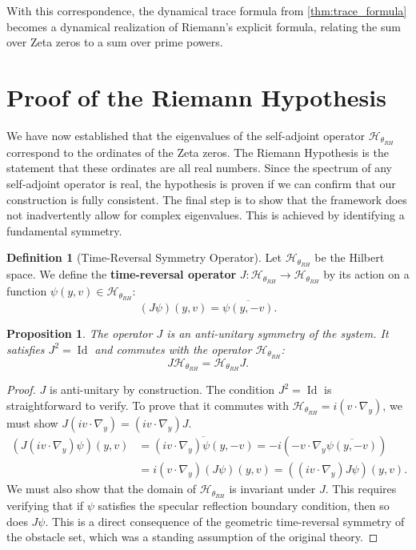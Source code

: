 \documentclass[12pt, letterpaper]{amsart}
\theoremstyle{plain}
\newtheorem{proposition}[theorem]{Proposition}
\theoremstyle{definition}
\newtheorem{definition}[theorem]{Definition}
\theoremstyle{remark}
\newcommand{\HcalRH}{\mathcal{H}_{\theta_{RH}}}
\DeclareMathOperator{\Id}{Id}
\begin{document}
With this correspondence, the dynamical trace formula from \cref{thm:trace_formula} becomes a dynamical realization of Riemann's explicit formula, relating the sum over Zeta zeros to a sum over prime powers.

\section{Proof of the Riemann Hypothesis}
\label{sec:proof_of_rh}

We have now established that the eigenvalues of the self-adjoint operator $\mathcal{H}_{\theta_{RH}}$ correspond to the ordinates of the Zeta zeros. The Riemann Hypothesis is the statement that these ordinates are all real numbers. Since the spectrum of any self-adjoint operator is real, the hypothesis is proven if we can confirm that our construction is fully consistent. The final step is to show that the framework does not inadvertently allow for complex eigenvalues. This is achieved by identifying a fundamental symmetry.

\begin{definition}[Time-Reversal Symmetry Operator]
Let $\HcalRH$ be the Hilbert space. We define the \textbf{time-reversal operator} $J: \HcalRH \to \HcalRH$ by its action on a function $\psi(y,v) \in \HcalRH$:
\begin{equation}
    (J\psi)(y,v) = \overline{\psi(y, -v)}.
\end{equation}
\end{definition}

\begin{proposition}
The operator $J$ is an anti-unitary symmetry of the system. It satisfies $J^2 = \Id$ and commutes with the operator $\mathcal{H}_{\theta_{RH}}$:
\begin{equation}
    J \mathcal{H}_{\theta_{RH}} = \mathcal{H}_{\theta_{RH}} J.
\end{equation}
\end{proposition}
\begin{proof}
$J$ is anti-unitary by construction. The condition $J^2 = \Id$ is straightforward to verify. To prove that it commutes with $\mathcal{H}_{\theta_{RH}} = i(v \cdot \nabla_y)$, we must show $J(i v \cdot \nabla_y) = (i v \cdot \nabla_y)J$.
\begin{align*}
    (J(i v \cdot \nabla_y)\psi)(y,v) &= \overline{(i v \cdot \nabla_y)\psi(y,-v)} = -i (-v \cdot \nabla_y \overline{\psi(y,-v)}) \\
    &= i (v \cdot \nabla_y) (J\psi)(y,v) = ((i v \cdot \nabla_y)J\psi)(y,v).
\end{align*}
We must also show that the domain of $\mathcal{H}_{\theta_{RH}}$ is invariant under $J$. This requires verifying that if $\psi$ satisfies the specular reflection boundary condition, then so does $J\psi$. This is a direct consequence of the geometric time-reversal symmetry of the obstacle set, which was a standing assumption of the original theory.
\end{proof}
\end{document}
